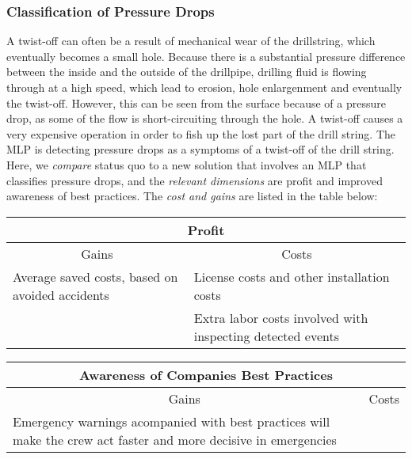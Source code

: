 \documentclass{article}
\theoremstyle{theorem}
\theoremstyle{definition}
\begin{document}
\subsubsection{Classification of Pressure Drops}
A twist-off can often be a result of mechanical wear of the drillstring, which eventually becomes a small hole. 
Because there is a substantial pressure difference between the inside and the outside of the drillpipe, drilling fluid is flowing through at a high speed, which lead to erosion, hole enlargenment and eventually the twist-off. 
However, this can be seen from the surface because of a pressure drop, as some of the flow is short-circuiting through the hole. 
A twist-off causes a very expensive operation in order to fish up the lost part of the drill string. 
The MLP is detecting pressure drops as a symptoms of a twist-off of the drill string. 
Here, we \emph{compare} status quo to a new solution that involves an MLP that classifies pressure drops, and the \emph{relevant dimensions} are profit and improved awareness of best practices.
The \emph{cost and gains} are listed in the table below:

\vspace{1ex}
\begin{tabular}{|p{}|p{}|}
\hline
\multicolumn{2}{|c|}{Profit}\\
\hline
\multicolumn{1}{|c|}{Gains} & 
\multicolumn{1}{|c|}{Costs} \\
\hline
Average saved costs, based on avoided accidents &
License costs and other installation costs \\ 
\hline
&
Extra labor costs involved with inspecting detected events \\ 
\hline
\end{tabular}
\vspace{1ex}

\vspace{1ex}
\begin{tabular}{|p{}|p{}|}
\hline
\multicolumn{2}{|c|}{Awareness of Companies Best Practices}\\
\hline
\multicolumn{1}{|c|}{Gains} & 
\multicolumn{1}{|c|}{Costs} \\
\hline
Emergency warnings acompanied with best practices will make the crew act faster and more decisive in emergencies & \\
\hline
\end{tabular}
\vspace{1ex}
\end{document}
